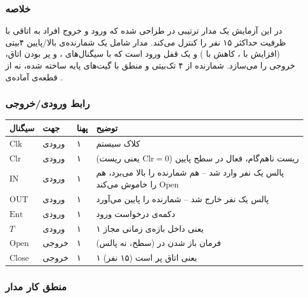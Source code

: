 \documentclass[10pt,a4paper]{article}
\begin{document}

\subsubsection*{خلاصه}

در این آزمایش یک مدار ترتیبی در  طراحی شده که ورود و خروج افراد به اتاقی با ظرفیت حداکثر ۱۵ نفر را کنترل می‌کند. مدار  شامل یک شمارنده‌ی بالا/پایین ۴بیتی (افزایش با ، کاهش با ) و یک قفل ورود است که با سیگنال‌های ،  و پر بودن اتاق، خروجی  را می‌سازد. شمارنده از ۴  تک‌بیتی و منطق  با گیت‌های پایه ساخته شده، نه از قطعه‌ی آماده‌ی .

\subsubsection*{رابط ورودی/خروجی}

\begin{center}
\begin{tabular}{@{}p{2.6cm}p{2.4cm}p{1.3cm}p{7.5cm}@{}}
\toprule
{سیگنال} & {جهت} & {پهنا} & {توضیح} \\
\midrule
$\mathrm{Clk}$  & ورودی & ۱ & کلاک سیستم \\
$\mathrm{Clr}$  & ورودی & ۱ & ریست ناهم‌گام، فعال در سطح پایین ($\mathrm{Clr}{=}0$ یعنی ریست) \\
$\mathrm{IN}$   & ورودی & ۱ & پالس یک نفر وارد شد -- هم شمارنده را بالا می‌برد، هم $\mathrm{Open}$ را خاموش می‌کند \\
$\mathrm{OUT}$  & ورودی & ۱ & پالس یک نفر خارج شد -- شمارنده را پایین می‌آورد \\
$\mathrm{Ent}$  & ورودی & ۱ & دکمه‌ی درخواست ورود \\
$T$    & ورودی & ۱ & ۱ یعنی داخل بازه‌ی زمانی مجاز \\
$\mathrm{Open}$ & خروجی & ۱ & فرمان باز شدن در (سطح، نه پالس) \\
$\mathrm{Close}$& خروجی & ۱ & ۱ یعنی اتاق پر است (۱۵ نفر) \\
\bottomrule
\end{tabular}
\end{center}

\subsubsection*{منطق کار مدار}
\end{document}
